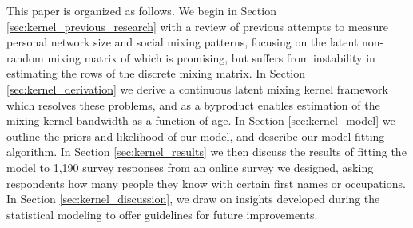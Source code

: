 This paper is organized as follows. We begin in Section \ref{sec:kernel_previous_research} with a review of previous attempts to measure personal network size and social mixing patterns, focusing on the latent non-random mixing matrix of \citet{McCormick+others:2010} which is promising, but suffers from instability in estimating the rows of the discrete mixing matrix. In Section \ref{sec:kernel_derivation} we derive a continuous latent mixing kernel framework which resolves these problems, and as a byproduct enables estimation of the mixing kernel bandwidth as a function of age. In Section \ref{sec:kernel_model} we outline the priors and likelihood of our model, and describe our model fitting algorithm. In Section \ref{sec:kernel_results} we then discuss the results of fitting the model to 1,190 survey responses from an online survey we designed, asking respondents how many people they know with certain first names or occupations. In Section \ref{sec:kernel_discussion}, we draw on insights developed during the statistical modeling to offer guidelines for future improvements.